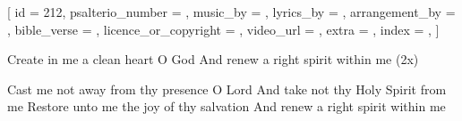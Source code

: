 
[
    id = {212},
    psalterio_number = {},
    music_by = {},
    lyrics_by = {},
    arrangement_by = {},
    bible_verse = {},
    licence_or_copyright = {},
    video_url = {},
    extra = {},
    index = {},
]


\beginverse
Create in me a clean heart O God
And renew a right spirit within me (2x)
\endverse


\beginchorus
Cast me not away from thy presence O Lord
And take not thy Holy Spirit from me
Restore unto me the joy of thy salvation
And renew a right spirit within me
\endchorus


\endsong
